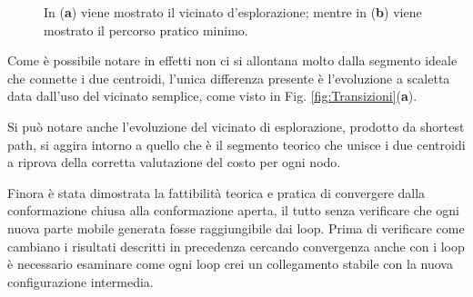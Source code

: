 \begin{figure}[H]
	\centering
	\caption{In (\textbf{a}) viene mostrato il vicinato d'esplorazione; mentre in (\textbf{b}) viene mostrato il percorso pratico minimo.}
	\label{fig:movimento}
\end{figure}

Come è possibile notare in effetti non ci si allontana molto dalla segmento ideale che connette i due centroidi, l'unica differenza presente è l'evoluzione a scaletta data dall'uso del vicinato semplice, come visto in Fig. \ref{fig:Transizioni}(\textbf{a}). 

Si può notare anche l'evoluzione del vicinato di esplorazione, prodotto da shortest path, si aggira intorno a quello che è il segmento teorico che unisce i due centroidi a riprova della corretta valutazione del costo per ogni nodo.

Finora è stata dimostrata la fattibilità teorica e pratica di convergere dalla conformazione chiusa alla conformazione aperta, il tutto senza verificare che ogni nuova parte mobile generata fosse raggiungibile dai loop. Prima di verificare come cambiano i risultati descritti in precedenza cercando convergenza anche con i loop è necessario esaminare come ogni loop crei un collegamento stabile  con la nuova configurazione intermedia. 

